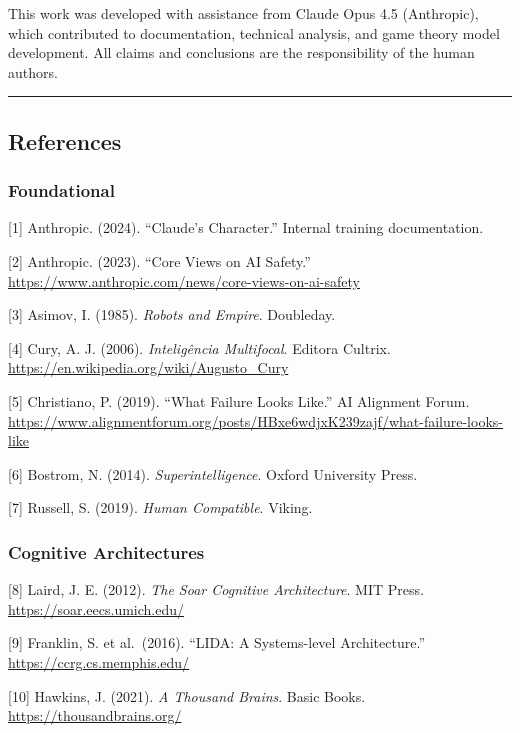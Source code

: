 \documentclass[
  11pt,
]{article}
\begin{document}
This work was developed with assistance from Claude Opus 4.5
(Anthropic), which contributed to documentation, technical analysis, and
game theory model development. All claims and conclusions are the
responsibility of the human authors.

\begin{center}\rule{0.5\linewidth}{0.5pt}\end{center}

\subsection{References}\label{references}

\subsubsection{Foundational}\label{foundational}

{[}1{]} Anthropic. (2024). ``Claude's Character.'' Internal training
documentation.

{[}2{]} Anthropic. (2023). ``Core Views on AI Safety.''
\url{https://www.anthropic.com/news/core-views-on-ai-safety}

{[}3{]} Asimov, I. (1985). \emph{Robots and Empire}. Doubleday.

{[}4{]} Cury, A. J. (2006). \emph{Inteligência Multifocal}. Editora
Cultrix. \url{https://en.wikipedia.org/wiki/Augusto_Cury}

{[}5{]} Christiano, P. (2019). ``What Failure Looks Like.'' AI Alignment
Forum.
\url{https://www.alignmentforum.org/posts/HBxe6wdjxK239zajf/what-failure-looks-like}

{[}6{]} Bostrom, N. (2014). \emph{Superintelligence}. Oxford University
Press.

{[}7{]} Russell, S. (2019). \emph{Human Compatible}. Viking.

\subsubsection{Cognitive Architectures}\label{cognitive-architectures}

{[}8{]} Laird, J. E. (2012). \emph{The Soar Cognitive Architecture}. MIT
Press. \url{https://soar.eecs.umich.edu/}

{[}9{]} Franklin, S. et al.~(2016). ``LIDA: A Systems-level
Architecture.'' \url{https://ccrg.cs.memphis.edu/}

{[}10{]} Hawkins, J. (2021). \emph{A Thousand Brains}. Basic Books.
\url{https://thousandbrains.org/}
\end{document}
